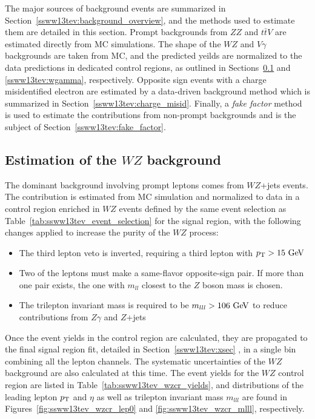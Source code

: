 The major sources of background events are summarized in Section~\ref{ssww13tev:background_overview}, and the methods used to estimate them are detailed in this section.  
Prompt backgrounds from $ZZ$ and $t\bar{t}V$ are estimated directly from MC simulations.
The shape of the $WZ$ and $V\gamma$ backgrounds are taken from MC, and the predicted yeilds are normalized to the data predictions in dedicated control regions, as outlined in Sections~\ref{ssww13tev:wz} and \ref{ssww13tev:wgamma}, respectively.
Opposite sign events with a charge misidentified electron are estimated by a data-driven background method which is summarized in Section~\ref{ssww13tev:charge_misid}.
Finally, a \emph{fake factor} method is used to estimate the contributions from non-prompt backgrounds and is the subject of Section~\ref{ssww13tev:fake_factor}.

\subsection{Estimation of the $WZ$ background}\label{ssww13tev:wz}
The dominant background involving prompt leptons comes from $WZ$+jets events.
The contribution is estimated from MC simulation and normalized to data in a control region enriched in $WZ$ events defined by the same event selection as Table~\ref{tab:ssww13tev_event_selection} for the signal region, with the following changes applied to increase the purity of the $WZ$ process:
\begin{itemize}
\item The third lepton veto is inverted, requiring a third lepton with $\pt > 15\gev$
\item Two of the leptons must make a same-flavor opposite-sign pair. If more than one pair exists, the one with $m_{ll}$ closest to the $Z$ boson mass is chosen.
\item The trilepton invariant mass is required to be $m_{lll} > 106\gev$ to reduce contributions from $Z\gamma$ and $Z$+jets
\end{itemize}

Once the event yields in the control region are calculated, they are propagated to the final signal region fit, detailed in Section~\ref{ssww13tev:xsec} , in a single bin combining all the lepton channels.
The systematic uncertainties of the $WZ$ background are also calculated at this time.
The event yields for the $WZ$ control region are listed in Table~\ref{tab:ssww13tev_wzcr_yields}, and distributions of the leading lepton $p_{\mathrm{T}}$ and $\eta$ as well as trilepton invariant mass $m_{lll}$ are found in Figures~\ref{fig:ssww13tev_wzcr_lep0} and \ref{fig:ssww13tev_wzcr_mlll}, respectively.

